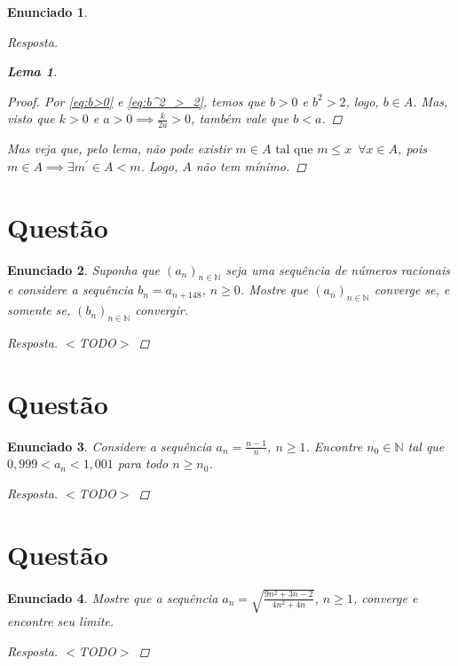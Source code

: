 \documentclass[a4paper,twoside,11pt]{article}
\newtheorem*{enunciado}{Enunciado}
\newtheorem*{lemma}{Lema}
\begin{document}
\begin{enunciado}
\begin{proof}[Resposta]
\begin{lemma}
\begin{proof}
                Por \ref{eq:b>0} e \ref{eq:b^2_>_2}, temos que $b > 0$ e $b^2 > 2$, logo,
                $b \in A$. Mas, visto que $k > 0$ e $a > 0 \implies \frac{k}{2a} > 0$,
                também vale que $b < a$. \qedhere
            \end{proof}
        \end{lemma}

        Mas veja que, pelo lema, não pode existir
        $m \in A \text{ tal que } m \leq x \enspace \forall x \in A $, pois
        $m \in A \implies \exists m^{\prime} \in A < m$. Logo, $A$ não tem mínimo.
    \end{proof}
\end{enunciado}



\section{Questão}
\begin{enunciado}
    Suponha que $(a_n)_{n \in \mathbb{N}}$ seja uma sequência de números racionais
    e considere a sequência $b_n = a_{n + 148}$, $n \geq 0$. Mostre que $(a_n)_{n \in \mathbb{N}}$
    converge se, e somente se, $(b_n)_{n \in \mathbb{N}}$ convergir.

    \begin{proof}[Resposta]
        $<$TODO$>$
    \end{proof}
\end{enunciado}



\section{Questão}
\begin{enunciado}
    Considere a sequência $a_n = \frac{n - 1}{n}$, $n \geq 1$. Encontre $n_0 \in \mathbb{N}$
    tal que $0,999 < a_n < 1,001$ para todo $n \geq n_0$.

    \begin{proof}[Resposta]
        $<$TODO$>$
    \end{proof}
\end{enunciado}



\section{Questão}
\begin{enunciado}
    Mostre que a sequência $a_n = \sqrt{\frac{9n^2 + 3n - 2}{4n^2+4n}}$, $n \geq 1$, converge e
    encontre seu limite.
    
    \begin{proof}[Resposta]
        $<$TODO$>$
    \end{proof}
\end{enunciado}
\end{document}
